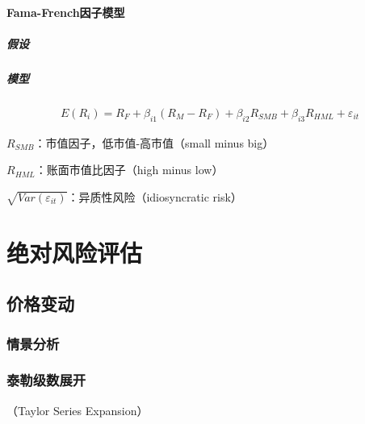 \documentclass[12pt]{book}
\begin{document}
\paragraph{Fama-French因子模型}

\subparagraph{假设}

\subparagraph{模型}	

\begin{gather*}
  E(R_i ) = R_F + \beta_{i1}(R_M-R_F) + \beta_{i2}R_{SMB} + \beta_{i3}R_{HML} + \varepsilon_{it}
\end{gather*}
\par $R_{SMB}$：市值因子，低市值-高市值（small minus big）
\par $R_{HML}$：账面市值比因子（high minus low）
\par $\sqrt{Var(\varepsilon_{it})}$：异质性风险（idiosyncratic risk）









\section{绝对风险评估}


\subsection{价格变动}


\subsubsection{情景分析}



\subsubsection{泰勒级数展开}

（Taylor Series Expansion）
\end{document}
